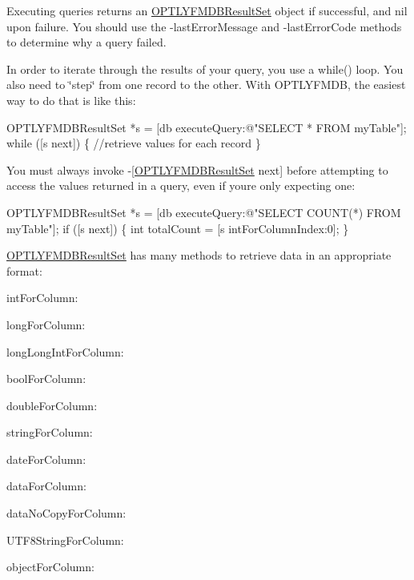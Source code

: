 Executing queries returns an {\ttfamily \mbox{\hyperlink{interface_o_p_t_l_y_f_m_d_b_result_set}{O\+P\+T\+L\+Y\+F\+M\+D\+B\+Result\+Set}}} object if successful, and {\ttfamily nil} upon failure. You should use the {\ttfamily -\/last\+Error\+Message} and {\ttfamily -\/last\+Error\+Code} methods to determine why a query failed.

In order to iterate through the results of your query, you use a {\ttfamily while()} loop. You also need to \char`\"{}step\char`\"{} from one record to the other. With O\+P\+T\+L\+Y\+F\+M\+DB, the easiest way to do that is like this\+:


\begin{DoxyCode}
OPTLYFMDBResultSet *s = [db executeQuery:@"SELECT * FROM myTable"];
while ([s next]) \{
    //retrieve values for each record
\}
\end{DoxyCode}


You must always invoke {\ttfamily -\/\mbox{[}\mbox{\hyperlink{interface_o_p_t_l_y_f_m_d_b_result_set}{O\+P\+T\+L\+Y\+F\+M\+D\+B\+Result\+Set}} next\mbox{]}} before attempting to access the values returned in a query, even if you\textquotesingle{}re only expecting one\+:


\begin{DoxyCode}
OPTLYFMDBResultSet *s = [db executeQuery:@"SELECT COUNT(*) FROM myTable"];
if ([s next]) \{
    int totalCount = [s intForColumnIndex:0];
\}
\end{DoxyCode}


{\ttfamily \mbox{\hyperlink{interface_o_p_t_l_y_f_m_d_b_result_set}{O\+P\+T\+L\+Y\+F\+M\+D\+B\+Result\+Set}}} has many methods to retrieve data in an appropriate format\+:


\begin{DoxyItemize}
\item {\ttfamily int\+For\+Column\+:}
\item {\ttfamily long\+For\+Column\+:}
\item {\ttfamily long\+Long\+Int\+For\+Column\+:}
\item {\ttfamily bool\+For\+Column\+:}
\item {\ttfamily double\+For\+Column\+:}
\item {\ttfamily string\+For\+Column\+:}
\item {\ttfamily date\+For\+Column\+:}
\item {\ttfamily data\+For\+Column\+:}
\item {\ttfamily data\+No\+Copy\+For\+Column\+:}
\item {\ttfamily U\+T\+F8\+String\+For\+Column\+:}
\item {\ttfamily object\+For\+Column\+:}
\end{DoxyItemize}

